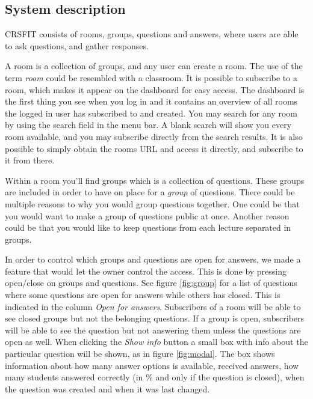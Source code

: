 \subsection{System description}

CRSFIT consists of rooms, groups, questions and answers, where users are able to ask questions, and gather responses.

A room is a collection of groups, and any user can create a room. The use of the term \emph{room} could be resembled with a classroom. It is possible to subscribe to a room, which makes it appear on the dashboard for easy access. The dashboard is the first thing you see when you log in and it contains an overview of all rooms the logged in user has subscribed to and created. You may search for any room by using the search field in the menu bar. A blank search will show you every room available, and you may subscribe directly from the search results. It is also possible to simply obtain the rooms URL and access it directly, and subscribe to it from there.

Within a room you'll find groups which is a collection of questions. These groups are included in order to have on place for a \emph{group} of questions. There could be multiple reasons to why you would group questions together. One could be that you would want to make a group of questions public at once. Another reason could be that you would like to keep questions from each lecture separated in groups.

In order to control which groups and questions are open for answers, we made a feature that would let the owner control the access. This is done by pressing open/close on groups and questions. See figure \ref{fig:group} for a list of questions where some questions are open for answers while others has closed. This is indicated in the column \emph{Open for answers}. Subscribers of a room will be able to see closed groups but not the belonging questions. If a group is open, subscribers will be able to see the question but not answering them unless the questions are open as well. When clicking the \emph{Show info} button a small box with info about the particular question will be shown, as in figure \ref{fig:modal}. The box shows information about how many answer options is available, received answers, how many students answered correctly (in \% and only if the question is closed), when the question was created and when it was last changed.

